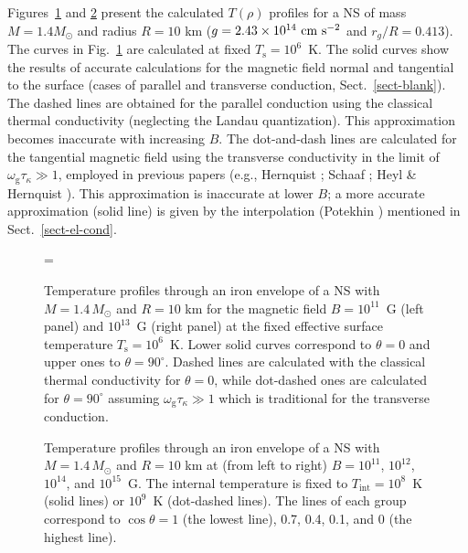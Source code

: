 \documentclass{aa}
\begin{document}
Figures~\ref{fig-profcomp} and \ref{fig-profiles}
present the calculated
$T(\rho)$ profiles for a NS of mass $M=1.4M_\odot$
and radius $R=10$ km 
($g=2.43\times10^{14}{\rm~cm~s}^{-2}$
and $r_g/R=0.413$). The curves in Fig.\ \ref{fig-profcomp}
are calculated at fixed $T_\mathrm{s}=10^6$~K.
The solid curves show the results of accurate calculations
for the magnetic field normal and tangential to the surface
(cases of parallel and transverse conduction, Sect.\ \ref{sect-blank}).
The dashed lines are obtained for the parallel conduction using
the classical thermal conductivity
(neglecting the Landau quantization).
This approximation becomes inaccurate with increasing $B$.
The dot-and-dash lines are calculated
for the tangential magnetic field
using the transverse conductivity in the limit of
$\omega_\mathrm{g}\tau_\kappa\gg1$, employed in previous papers
(e.g., Hernquist \cite{hern84,hern85}; 
Schaaf \cite{schaaf88,schaaf90a,schaaf};
Heyl \& Hernquist \cite{hh-theory,hh-multi}).
This approximation is inaccurate at lower $B$;
a more accurate approximation (solid line) is given by 
the interpolation (Potekhin \cite{P99}) 
mentioned in Sect.~\ref{sect-el-cond}.

\begin{figure}
\centering
\epsfxsize=\hsize
\caption{Temperature profiles through an iron envelope of
a NS with $M=1.4\,M_\odot$ and $R=10$ km
for the magnetic field $B=10^{11}$~G (left panel)
and $10^{13}$~G (right panel) at
the fixed effective surface temperature $T_\mathrm{s}=10^6$~K.
Lower solid curves correspond to
$\theta=0$ and upper ones to $\theta=90^\circ$.
Dashed lines are calculated with the classical thermal conductivity
for $\theta=0$,
while dot-dashed ones are calculated for $\theta=90^\circ$ assuming
$\omega_\mathrm{g}\tau_\kappa\gg1$ which is
traditional for the transverse conduction.
 }
\label{fig-profcomp}
\end{figure}

\begin{figure}
\centering
\epsfxsize=17cm
\caption{Temperature profiles through an iron envelope of
a NS with $M=1.4\,M_\odot$ and $R=10$ km
at (from left to right)
$B=10^{11}$, $10^{12}$, $10^{14}$,
and $10^{15}$~G.
The internal temperature is fixed to $T_\mathrm{int}=10^8$~K
(solid lines) or $10^9$~K (dot-dashed lines).
The lines of each group correspond to
$\cos\theta=1$ (the lowest line),
0.7, 0.4, 0.1, and 0 (the highest line).
 }
\label{fig-profiles}
\end{figure}
\end{document}
